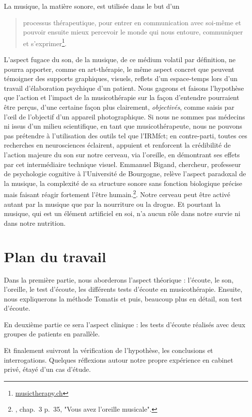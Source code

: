 La musique, la matière sonore, est utilisée dans le but d'un 
\begin{quote}
	processus thérapeutique, pour entrer en communication avec soi-même et pouvoir ensuite mieux percevoir le monde qui nous
	entoure, communiquer et s'exprimer\footnote{%
		\href{http://www.musictherapy.ch/fr/musicotherapie/quest-ce-que-la-musicotherapie/}{musictherapy.ch}}.
\end{quote}


L'aspect fugace du son, de la musique, de ce médium volatil par
définition, ne pourra apporter, comme en art-thérapie, le
même aspect concret que peuvent témoigner des supports graphiques,
visuels, reflets d'un espace-temps lors d'un travail d'élaboration
psychique d'un patient. Nous gageons et faisons l'hypothèse que l'action et l'impact de la
musicothérapie sur la façon d'entendre pourraient être perçus, d'une certaine façon plus
clairement, \textsl{ objectivés}, comme saisis par l'\oe il de l'objectif d'un appareil
photographique.
Si nous ne sommes pas médecins ni issus d'un milieu scientifique, en tant que musicothérapeute, nous ne pouvons pas prétendre à l'utilisation des outils
 tel que l'IRMfct; en contre-parti, toutes ces recherches en
neurosciences éclairent, appuient et renforcent la crédibilité de l'action
majeure du son sur notre cerveau, via l'oreille, en démontrant ses effets par cet intermédiaire technique visuel.  Emmanuel Bigand, chercheur, professeur de
psychologie cognitive à l'Université de Bourgogne, relève l'aspect
paradoxal de la musique, la complexité de sa structure sonore sans
fonction biologique précise mais faisant réagir fortement l'être
humain.\footnote{\cite{bigand:cerveau}, chap.~3 p.~35, "Vous avez l'oreille musicale".}.  Notre cerveau peut être activé autant par
la musique que par la nourriture ou la drogue. Et pourtant la musique,
qui est un élément artificiel en soi, n'a aucun rôle dans notre survie ni dans
notre nutrition.


\section{Plan du travail}

Dans la première partie, nous aborderons l'aspect théorique : l'écoute, le son, l'oreille, le test d'écoute, les différents tests d'écoute en musicothérapie.  Ensuite, nous expliquerons  la méthode Tomatis
et puis, beaucoup plus en détail, son test d'écoute.

En deuxième partie ce sera l'aspect clinique : les tests d'écoute réalisés  avec deux groupes de patients en parallèle.

Et finalement suivront la vérification de l'hypothèse, les conclusions et interrogations. 
Quelques réflexions autour notre propre expérience en cabinet privé, étayé d'un cas d'étude.
